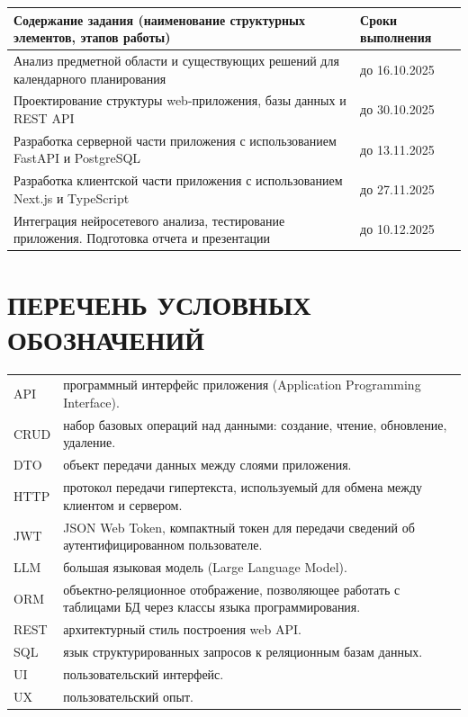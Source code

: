 \documentclass[14pt,a4paper]{extreport}
\begin{document}
\begin{longtable}{|p{}|p{}|}
\hline
\textbf{Содержание задания (наименование структурных элементов, этапов работы)} & \textbf{Сроки выполнения} \\
\hline
Анализ предметной области и существующих решений для календарного планирования & до 16.10.2025 \\
\hline
Проектирование структуры web-приложения, базы данных и REST API & до 30.10.2025 \\
\hline
Разработка серверной части приложения с использованием FastAPI и PostgreSQL & до 13.11.2025 \\
\hline
Разработка клиентской части приложения с использованием Next.js и TypeScript & до 27.11.2025 \\
\hline
Интеграция нейросетевого анализа, тестирование приложения. Подготовка отчета и презентации & до 10.12.2025 \\
\hline
\end{longtable}

\newpage
{}
\setcounter{page}{2}
\tableofcontents

\chapter*{ПЕРЕЧЕНЬ УСЛОВНЫХ ОБОЗНАЧЕНИЙ}

\begin{longtable}{p{}p{}}
API & программный интерфейс приложения (Application Programming Interface).\\
CRUD & набор базовых операций над данными: создание, чтение, обновление, удаление.\\
DTO & объект передачи данных между слоями приложения.\\
HTTP & протокол передачи гипертекста, используемый для обмена между клиентом и сервером.\\
JWT & JSON Web Token, компактный токен для передачи сведений об аутентифицированном пользователе.\\
LLM & большая языковая модель (Large Language Model).\\
ORM & объектно-реляционное отображение, позволяющее работать с таблицами БД через классы языка программирования.\\
REST & архитектурный стиль построения web API.\\
SQL & язык структурированных запросов к реляционным базам данных.\\
UI & пользовательский интерфейс.\\
UX & пользовательский опыт.\\
\end{longtable}
\end{document}
